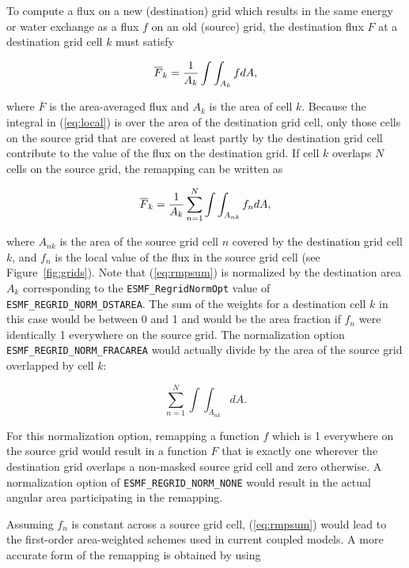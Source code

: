 \begin{description}
     To compute a flux on a new (destination) grid which results in the same
     energy or water exchange as a flux $f$ on an old (source) grid, the
     destination flux $F$ at a destination grid cell $k$ must satisfy

\begin{equation}\label{eq:local}
\overline{F}_k = {1\over{A_k}}\int\int_{A_k} fdA,
\end{equation}

     where $\overline{F}$ is the area-averaged flux and $A_k$ is the area of
     cell $k$. Because the integral in (\ref{eq:local}) is over the area of 
     the destination grid cell, only those cells on the source grid that are
     covered at least partly by the destination grid cell contribute to the
     value of the flux on the destination grid.  If cell $k$ overlaps $N$ cells
     on the source grid, the remapping can be written as 

\begin{equation}\label{eq:rmpsum}
\overline{F}_k = 
{1\over{A_k}} \sum_{n=1}^N \int\int_{A_{nk}} f_ndA,
\end{equation}

     where $A_{nk}$ is the area of the source grid cell $n$ covered by the
     destination grid cell $k$, and $f_n$ is the local value of the flux in the
     source grid cell (see Figure~\ref{fig:grids}).  Note that (\ref{eq:rmpsum})
     is normalized by the destination area $A_k$ corresponding to the
     {\tt ESMF\_RegridNormOpt} value of {\tt ESMF\_REGRID\_NORM\_DSTAREA}.  The
     sum of the weights for a destination cell $k$ in this case would be between
     0 and 1 and would be the area fraction if $f_n$ were identically 1 
     everywhere on the source grid.  The normalization option
     {\tt ESMF\_REGRID\_NORM\_FRACAREA} would actually divide by the area of the
     source grid overlapped by cell $k$: 

\begin{equation}
\sum_{n=1}^N \int\int_{A_{nk}}dA.
\end{equation}

     For this normalization option, remapping a function $f$ which is 1
     everywhere on the source grid would result in a function $F$ that is
     exactly one wherever the destination grid overlaps a non-masked source
     grid cell and zero otherwise.  A normalization option of
     {\tt ESMF\_REGRID\_NORM\_NONE} would result in the actual angular area
     participating in the remapping.

     Assuming $f_n$ is constant across a source grid cell, (\ref{eq:rmpsum})
     would lead to the first-order area-weighted schemes used in current coupled
     models.  A more accurate form of the remapping is obtained by using 


\end{description}
